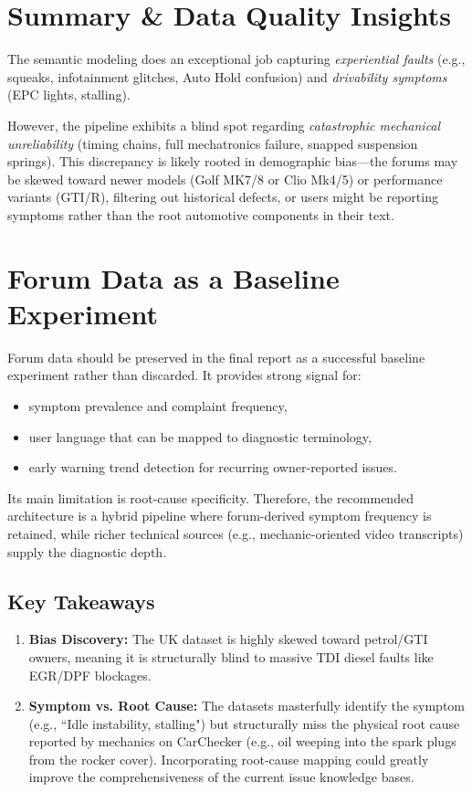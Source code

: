 \documentclass[11pt,a4paper]{article}
\begin{document}
\section{Summary \& Data Quality Insights}
The semantic modeling does an exceptional job capturing \textit{experiential faults} (e.g., squeaks, infotainment glitches, Auto Hold confusion) and \textit{drivability symptoms} (EPC lights, stalling). 

However, the pipeline exhibits a blind spot regarding \textit{catastrophic mechanical unreliability} (timing chains, full mechatronics failure, snapped suspension springs). This discrepancy is likely rooted in demographic bias—the forums may be skewed toward newer models (Golf MK7/8 or Clio Mk4/5) or performance variants (GTI/R), filtering out historical defects, or users might be reporting symptoms rather than the root automotive components in their text.

\section{Forum Data as a Baseline Experiment}
Forum data should be preserved in the final report as a successful baseline experiment rather than discarded. It provides strong signal for:
\begin{itemize}
    \item symptom prevalence and complaint frequency,
    \item user language that can be mapped to diagnostic terminology,
    \item early warning trend detection for recurring owner-reported issues.
\end{itemize}

Its main limitation is root-cause specificity. Therefore, the recommended architecture is a hybrid pipeline where forum-derived symptom frequency is retained, while richer technical sources (e.g., mechanic-oriented video transcripts) supply the diagnostic depth.

\subsection{Key Takeaways}
\begin{enumerate}
    \item \textbf{Bias Discovery:} The UK dataset is highly skewed toward petrol/GTI owners, meaning it is structurally blind to massive TDI diesel faults like EGR/DPF blockages.
    \item \textbf{Symptom vs. Root Cause:} The datasets masterfully identify the symptom (e.g., ``Idle instability, stalling") but structurally miss the physical root cause reported by mechanics on CarChecker (e.g., oil weeping into the spark plugs from the rocker cover). Incorporating root-cause mapping could greatly improve the comprehensiveness of the current issue knowledge bases.
\end{enumerate}
\end{document}

